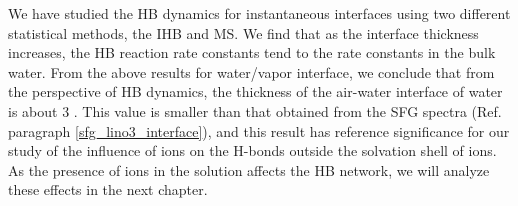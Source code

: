 We have studied the HB dynamics for instantaneous interfaces using two different statistical methods, the IHB and MS.
We find that as the interface thickness increases, 
the HB reaction rate constants tend to the rate constants in the bulk water.
From the above results for water/vapor interface, we conclude that from the perspective of HB dynamics,
the thickness of the air-water interface of water is about 3 \A. This value is smaller than that obtained from the SFG spectra 
(Ref. paragraph \thinspace\ref{sfg_lino3_interface}), and this result has reference significance for our study of the influence of ions on the H-bonds 
outside the solvation shell of ions. 
As the presence of ions in the solution affects the HB network, we will analyze these effects in the next chapter.

